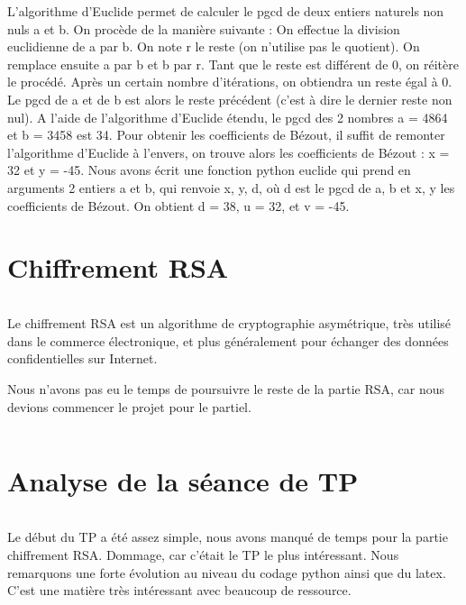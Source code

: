 \documentclass{article}
\begin{document}
$$ $$
$$ $$
$$ $$
$$ $$
$$ $$
$$ $$ 

L’algorithme d’Euclide permet de calculer le pgcd de deux entiers naturels non nuls a et b. On procède de la manière suivante : On effectue la division euclidienne de a par b. On note r le reste (on n’utilise pas le quotient). On remplace ensuite a par b et b par r. Tant que le reste est différent de 0, on réitère le procédé. Après un certain nombre d’itérations, on obtiendra un reste égal à 0. Le pgcd de a et de b est alors le reste précédent (c’est à dire le dernier reste non nul). 
\newline
\newline
A l'aide de l'algorithme d'Euclide étendu, le pgcd des 2 nombres a = 4864 et b = 3458 est 34. Pour obtenir les coefficients de Bézout, il suffit de remonter l'algorithme d'Euclide à l'envers, on trouve alors les coefficients de Bézout : x = 32 et y = -45. 
\newline
\newline
Nous avons écrit une fonction python euclide qui prend en arguments 2 entiers a et b, qui renvoie x, y, d, où d est le pgcd de a, b et x, y les coefficients de Bézout. On obtient d = 38, u = 32, et v = -45.
$$ $$

\section{Chiffrement RSA}
$$ $$

Le chiffrement RSA est un algorithme de cryptographie asymétrique, très utilisé dans le commerce électronique, et plus généralement pour échanger des données confidentielles sur Internet.
\newline
\newline

Nous n'avons pas eu le temps de poursuivre le reste de la partie RSA, car nous devions commencer le projet pour le partiel.

$$ $$

\section{Analyse de la séance de TP}

$$ $$

Le début du TP a été assez simple, nous avons manqué de temps pour la partie chiffrement RSA. Dommage, car c'était le TP le plus intéressant. Nous remarquons une forte évolution au niveau du codage python ainsi que du latex.
\newline
C'est une matière très intéressant avec beaucoup de ressource. 
\end{document}
